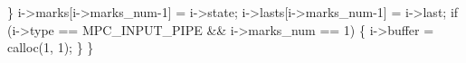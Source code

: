 \documentclass[
  a4paper,
]{scrreprt}
\newenvironment{Shaded}{\begin{snugshade}}{\end{snugshade}}
\newcommand{\ControlFlowTok}[1]{\textcolor[rgb]{0.85,0.12,0.09}{#1}}
\newcommand{\DecValTok}[1]{\textcolor[rgb]{0.47,0.16,0.63}{#1}}
\newcommand{\NormalTok}[1]{\textcolor[rgb]{0.33,0.33,0.33}{#1}}
\newcommand{\OperatorTok}[1]{\textcolor[rgb]{0.00,0.46,0.62}{#1}}
\theoremstyle{definition}
\theoremstyle{remark}
\begin{document}
\begin{Shaded}
\begin{Highlighting}[numbers=left,,]
  \OperatorTok{\}}
\NormalTok{  i}\OperatorTok{{-}\textgreater{}}\NormalTok{marks}\OperatorTok{[}\NormalTok{i}\OperatorTok{{-}\textgreater{}}\NormalTok{marks\_num}\OperatorTok{{-}}\DecValTok{1}\OperatorTok{]} \OperatorTok{=}\NormalTok{ i}\OperatorTok{{-}\textgreater{}}\NormalTok{state}\OperatorTok{;}
\NormalTok{  i}\OperatorTok{{-}\textgreater{}}\NormalTok{lasts}\OperatorTok{[}\NormalTok{i}\OperatorTok{{-}\textgreater{}}\NormalTok{marks\_num}\OperatorTok{{-}}\DecValTok{1}\OperatorTok{]} \OperatorTok{=}\NormalTok{ i}\OperatorTok{{-}\textgreater{}}\NormalTok{last}\OperatorTok{;}
  \ControlFlowTok{if} \OperatorTok{(}\NormalTok{i}\OperatorTok{{-}\textgreater{}}\NormalTok{type }\OperatorTok{==}\NormalTok{ MPC\_INPUT\_PIPE }\OperatorTok{\&\&}\NormalTok{ i}\OperatorTok{{-}\textgreater{}}\NormalTok{marks\_num }\OperatorTok{==} \DecValTok{1}\OperatorTok{)} \OperatorTok{\{}
\NormalTok{    i}\OperatorTok{{-}\textgreater{}}\NormalTok{buffer }\OperatorTok{=}\NormalTok{ calloc}\OperatorTok{(}\DecValTok{1}\OperatorTok{,} \DecValTok{1}\OperatorTok{);}
  \OperatorTok{\}}
\OperatorTok{\}}


\end{Highlighting}
\end{Shaded}
\end{document}
